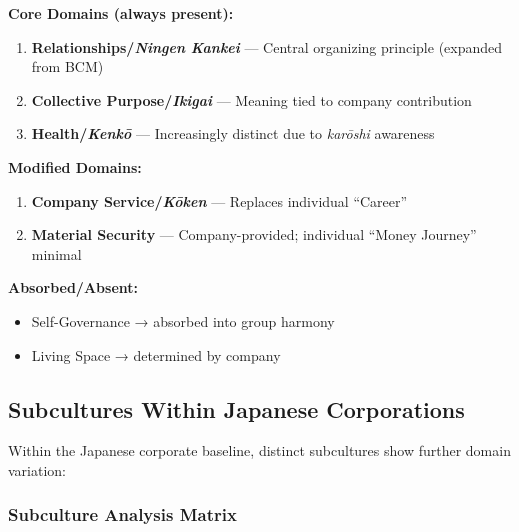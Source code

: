\begin{tcolorbox}[colback=blue!5!white, colframe=blue!75!black, title=Japanese Corporate Baseline: N$_{\text{eff}}$ = 4-5]

\textbf{Core Domains (always present):}
\begin{enumerate}[nosep]
\item \textbf{Relationships/\textit{Ningen Kankei}} --- Central organizing principle (expanded from BCM)
\item \textbf{Collective Purpose/\textit{Ikigai}} --- Meaning tied to company contribution
\item \textbf{Health/\textit{Kenkō}} --- Increasingly distinct due to \textit{karōshi} awareness
\end{enumerate}

\textbf{Modified Domains:}
\begin{enumerate}[nosep, start=4]
\item \textbf{Company Service/\textit{Kōken}} --- Replaces individual ``Career''
\item \textbf{Material Security} --- Company-provided; individual ``Money Journey'' minimal
\end{enumerate}

\textbf{Absorbed/Absent:}
\begin{itemize}[nosep]
\item Self-Governance → absorbed into group harmony
\item Living Space → determined by company
\end{itemize}

\end{tcolorbox}

\subsection{Subcultures Within Japanese Corporations}

Within the Japanese corporate baseline, distinct subcultures show further domain variation:

\subsubsection{Subculture Analysis Matrix}

